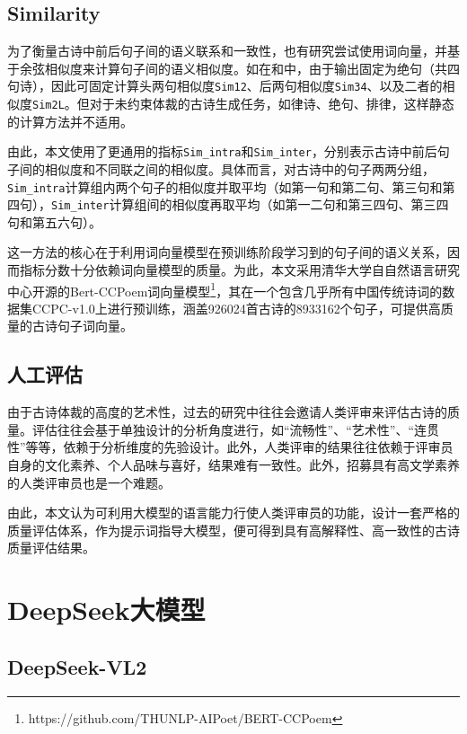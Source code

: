 \subsection{Similarity}
为了衡量古诗中前后句子间的语义联系和一致性，也有研究尝试使用词向量，并基于余弦相似度来计算句子间的语义相似度。如在\cite{chenPolishingModelMachineGenerated2024}和\cite{dengIterativePolishingFramework2020}中，由于输出固定为绝句（共四句诗），因此可固定计算头两句相似度\verb|Sim12|、后两句相似度\verb|Sim34|、以及二者的相似度\verb|Sim2L|。但对于未约束体裁的古诗生成任务，如律诗、绝句、排律，这样静态的计算方法并不适用。

由此，本文使用了更通用的指标\verb|Sim_intra|和\verb|Sim_inter|，分别表示古诗中前后句子间的相似度和不同联之间的相似度。具体而言，对古诗中的句子两两分组，\verb|Sim_intra|计算组内两个句子的相似度并取平均（如第一句和第二句、第三句和第四句），\verb|Sim_inter|计算组间的相似度再取平均（如第一二句和第三四句、第三四句和第五六句）。

这一方法的核心在于利用词向量模型在预训练阶段学习到的句子间的语义关系，因而指标分数十分依赖词向量模型的质量。为此，本文采用清华大学自自然语言研究中心开源的Bert-CCPoem词向量模型\footnote{https://github.com/THUNLP-AIPoet/BERT-CCPoem}，其在一个包含几乎所有中国传统诗词的数据集CCPC-v1.0上进行预训练，涵盖926024首古诗的8933162个句子，可提供高质量的古诗句子词向量。

\subsection{人工评估}

由于古诗体裁的高度的艺术性，过去的研究中往往会邀请人类评审来评估古诗的质量。评估往往会基于单独设计的分析角度进行，如“流畅性”、“艺术性”、“连贯性”等等，依赖于分析维度的先验设计。此外，人类评审的结果往往依赖于评审员自身的文化素养、个人品味与喜好，结果难有一致性。此外，招募具有高文学素养的人类评审员也是一个难题。

由此，本文认为可利用大模型的语言能力行使人类评审员的功能，设计一套严格的质量评估体系，作为提示词指导大模型，便可得到具有高解释性、高一致性的古诗质量评估结果。


\section{DeepSeek大模型}

\subsection{DeepSeek-VL2}

